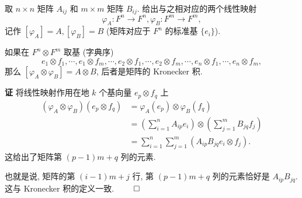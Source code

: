 \begin{example}
  \

  取 $n \times n$ 矩阵 $A_{ij}$ 和 $m \times m$ 矩阵 $B_{ij}$. 给出与之相对应的两个线性映射
  \begin{equation*}
    \varphi_A: F^n \to F^n, \varphi_B: F^m \to F^m, 
  \end{equation*}
  记作 $[\varphi_A]=A, [\varphi_B]=B$ (矩阵对应于 $F^n$ 的标准基 $\{e_i\}$). 

  如果在 $F^n \otimes F^m$ 取基 (字典序)
  \begin{equation*}
    e_1 \otimes f_1, \cdots, e_1 \otimes f_m, \cdots, e_2 \otimes f_1, \cdots, e_2 \otimes f_m, \cdots, e_n \otimes f_1, \cdots, e_n \otimes f_m,
  \end{equation*}
  那么 $[\varphi_A \otimes \varphi_B] = A \otimes B$, 后者是矩阵的 Kronecker 积.
\end{example}

\hspace{-2em}\textbf{证} \hspace{0.5em} 将线性映射作用在地 $k$ 个基向量 $e_p \otimes f_q$ 上
\begin{align*}
    (\varphi_A \otimes \varphi_B)(e_p \otimes f_q) &= \varphi_A(e_p) \otimes \varphi_B(f_q) \\
    &= \left( \sum_{i=1}^n A_{ip} e_i \right) \otimes \left( \sum_{j=1}^m B_{jq} f_j \right) \\
    &= \sum_{i=1}^n\sum_{j=1}^m \left(A_{ip}B_{jq} e_i \otimes f_j \right).
\end{align*}
这给出了矩阵第 $(p-1)m+q$ 列的元素.

也就是说, 矩阵的第 $(i-1)m+j$ 行, 第 $(p-1)m+q$ 列的元素恰好是 $A_{ip}B_{jq}$. 这与 Kronecker 积的定义一致. \hfill\(\qed\)

\newpage